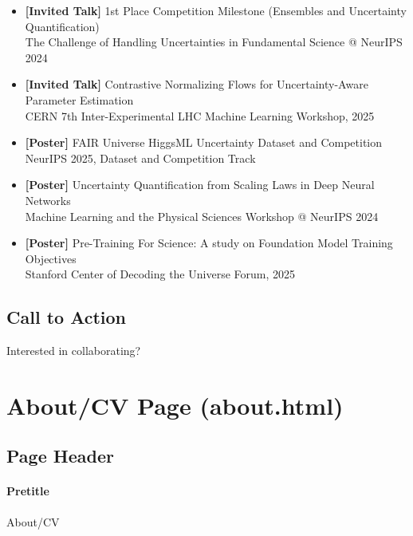 \documentclass[11pt]{article}
\begin{document}
\begin{itemize}
    \item \textbf{[Invited Talk]} 1st Place Competition Milestone (Ensembles and Uncertainty Quantification)\\
    The Challenge of Handling Uncertainties in Fundamental Science @ NeurIPS 2024

    \item \textbf{[Invited Talk]} Contrastive Normalizing Flows for Uncertainty-Aware Parameter Estimation\\
    CERN 7th Inter-Experimental LHC Machine Learning Workshop, 2025

    \item \textbf{[Poster]} FAIR Universe HiggsML Uncertainty Dataset and Competition\\
    NeurIPS 2025, Dataset and Competition Track

    \item \textbf{[Poster]} Uncertainty Quantification from Scaling Laws in Deep Neural Networks\\
    Machine Learning and the Physical Sciences Workshop @ NeurIPS 2024

    \item \textbf{[Poster]} Pre-Training For Science: A study on Foundation Model Training Objectives\\
    Stanford Center of Decoding the Universe Forum, 2025
\end{itemize}

\subsection{Call to Action}
\label{sec:research-cta}
Interested in collaborating?


\section{About/CV Page (about.html)}

\subsection{Page Header}
\label{sec:about-header}

\paragraph{Pretitle}
About/CV
\end{document}
